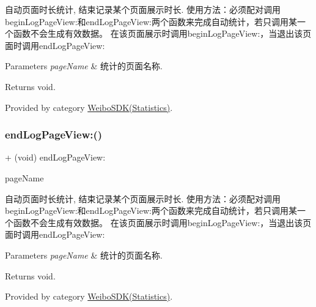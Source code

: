 自动页面时长统计, 结束记录某个页面展示时长. 使用方法：必须配对调用begin\+Log\+Page\+View\+:和end\+Log\+Page\+View\+:两个函数来完成自动统计，若只调用某一个函数不会生成有效数据。 在该页面展示时调用begin\+Log\+Page\+View\+:，当退出该页面时调用end\+Log\+Page\+View\+: 
\begin{DoxyParams}{Parameters}
{\em page\+Name} & 统计的页面名称. \\
\hline
\end{DoxyParams}
\begin{DoxyReturn}{Returns}
void. 
\end{DoxyReturn}


Provided by category \mbox{\hyperlink{category_weibo_s_d_k_07_statistics_08_aa9460b8e4fd90f3b437207c55ef2c40e}{Weibo\+S\+D\+K(\+Statistics)}}.

\mbox{\label{interface_weibo_s_d_k_aa9460b8e4fd90f3b437207c55ef2c40e}} 
\subsubsection{\texorpdfstring{end\+Log\+Page\+View\+:()}{endLogPageView:()}\hspace{0.1cm}{\footnotesize\ttfamily [3/3]}}
{\footnotesize\ttfamily + (void) end\+Log\+Page\+View\+: \begin{DoxyParamCaption}\item[{(N\+S\+String $\ast$)}]{page\+Name }\end{DoxyParamCaption}}

自动页面时长统计, 结束记录某个页面展示时长. 使用方法：必须配对调用begin\+Log\+Page\+View\+:和end\+Log\+Page\+View\+:两个函数来完成自动统计，若只调用某一个函数不会生成有效数据。 在该页面展示时调用begin\+Log\+Page\+View\+:，当退出该页面时调用end\+Log\+Page\+View\+: 
\begin{DoxyParams}{Parameters}
{\em page\+Name} & 统计的页面名称. \\
\hline
\end{DoxyParams}
\begin{DoxyReturn}{Returns}
void. 
\end{DoxyReturn}


Provided by category \mbox{\hyperlink{category_weibo_s_d_k_07_statistics_08_aa9460b8e4fd90f3b437207c55ef2c40e}{Weibo\+S\+D\+K(\+Statistics)}}.

